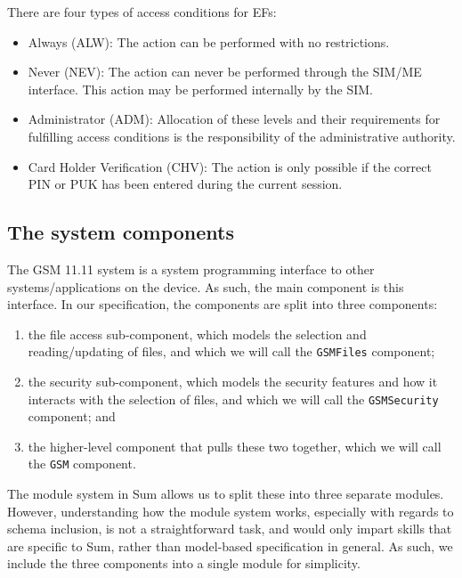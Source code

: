 There are four types of access conditions for EFs:

\begin{itemize}
\item Always (ALW): The action can be performed with no restrictions.
\item Never (NEV): The action can never be performed through the SIM/ME
  interface. This action may be performed internally by the SIM.
\item Administrator (ADM): Allocation of these levels and their
  requirements for fulfilling access conditions is the responsibility of the
  administrative authority.
\item Card Holder Verification (CHV): The action is only possible if
  the correct PIN or PUK has been entered during the current session.
\end{itemize}

\subsection{The system components}

The GSM 11.11 system is a system programming interface to other systems/applications on the device. As such, the main component is this interface. In our specification, the components are split into three components:

 \begin{enumerate}

  \item the file access sub-component, which models the selection and reading/updating of files, and which we will call the \texttt{GSMFiles} component;
  \item the security sub-component, which models the security features and how it interacts with the selection of files, and which we will call the \texttt{GSMSecurity} component; and
  \item the higher-level component that pulls these two together, which we will call the \texttt{GSM} component.

\end{enumerate}

The module system in Sum allows us to split these into three separate modules. However, understanding how the module system works, especially with regards to schema inclusion, is not a straightforward task, and would only impart skills that are specific to Sum, rather than model-based specification in general. As such, we include the three components into a single module for simplicity.

